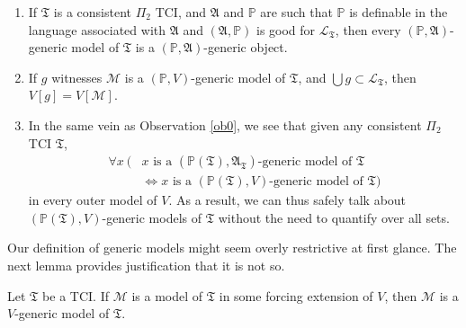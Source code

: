 \documentclass[12pt]{article}
\numberwithin{equation}{section}
\begin{document}
\begin{ob}\label{smallvgen}
\leavevmode
\begin{enumerate}[label=(\arabic*)]
    \item\label{4401} If $\mathfrak{T}$ is a consistent $\Pi_2$ TCI, and $\mathfrak{A}$ and $\mathbb{P}$ are such that $\mathbb{P}$ is definable in the language associated with $\mathfrak{A}$ and $(\mathfrak{A}, \mathbb{P})$ is good for $\mathcal{L}_{\mathfrak{T}}$, then every $(\mathbb{P}, \mathfrak{A})$-generic model of $\mathfrak{T}$ is a $(\mathbb{P}, \mathfrak{A})$-generic object.
    \item\label{5282} If $g$ witnesses $\mathcal{M}$ is a $(\mathbb{P}, V)$-generic model of $\mathfrak{T}$, and $\bigcup g \subset \mathcal{L}_{\mathfrak{T}}$, then $V[g] = V[\mathcal{M}]$.
    \item\label{2svg} In the same vein as Observation \ref{ob0}, we see that given any consistent $\Pi_2$ TCI $\mathfrak{T}$, 
    \begin{align*}
        \forall x \ ( & x \text{ is a } (\mathbb{P}(\mathfrak{T}), \mathfrak{A}_{\mathfrak{T}}) \text{-generic model of } \mathfrak{T} \\
        & \iff x \text{ is a } (\mathbb{P}(\mathfrak{T}), V) \text{-generic model of } \mathfrak{T})
    \end{align*}
   in every outer model of $V$. As a result, we can thus safely talk about $(\mathbb{P}(\mathfrak{T}), V)$-generic models of $\mathfrak{T}$ without the need to quantify over all sets.
\end{enumerate}
\end{ob}

Our definition of generic models might seem overly restrictive at first glance. The next lemma provides justification that it is not so.

\begin{lem}\label{gmodelsinfe}
Let $\mathfrak{T}$ be a TCI. If $\mathcal{M}$ is a model of $\mathfrak{T}$ in some forcing extension of $V$, then $\mathcal{M}$ is a $V$-generic model of $\mathfrak{T}$.
\end{lem}
\end{document}
